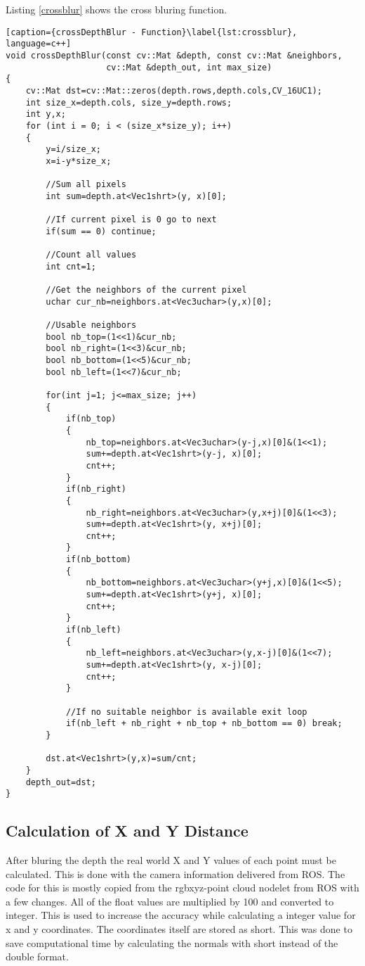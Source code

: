 
Listing \vref{crossblur} shows the cross bluring function.

\begin{lstlisting}[caption={crossDepthBlur - Function}\label{lst:crossblur}, language=c++]
void crossDepthBlur(const cv::Mat &depth, const cv::Mat &neighbors, 
                    cv::Mat &depth_out, int max_size)
{
	cv::Mat dst=cv::Mat::zeros(depth.rows,depth.cols,CV_16UC1);
	int size_x=depth.cols, size_y=depth.rows;
	int y,x;
	for (int i = 0; i < (size_x*size_y); i++)
	{
		y=i/size_x;
		x=i-y*size_x;

		//Sum all pixels
		int sum=depth.at<Vec1shrt>(y, x)[0];

		//If current pixel is 0 go to next
		if(sum == 0) continue;

		//Count all values
		int cnt=1;

		//Get the neighbors of the current pixel
		uchar cur_nb=neighbors.at<Vec3uchar>(y,x)[0];

		//Usable neighbors
		bool nb_top=(1<<1)&cur_nb;
		bool nb_right=(1<<3)&cur_nb;
		bool nb_bottom=(1<<5)&cur_nb;
		bool nb_left=(1<<7)&cur_nb;

		for(int j=1; j<=max_size; j++)
		{
			if(nb_top)
			{
				nb_top=neighbors.at<Vec3uchar>(y-j,x)[0]&(1<<1);
				sum+=depth.at<Vec1shrt>(y-j, x)[0];
				cnt++;
			}
			if(nb_right)
			{
				nb_right=neighbors.at<Vec3uchar>(y,x+j)[0]&(1<<3);
				sum+=depth.at<Vec1shrt>(y, x+j)[0];
				cnt++;
			}
			if(nb_bottom)
			{
				nb_bottom=neighbors.at<Vec3uchar>(y+j,x)[0]&(1<<5);
				sum+=depth.at<Vec1shrt>(y+j, x)[0];
				cnt++;
			}
			if(nb_left)
			{
				nb_left=neighbors.at<Vec3uchar>(y,x-j)[0]&(1<<7);
				sum+=depth.at<Vec1shrt>(y, x-j)[0];
				cnt++;
			}

			//If no suitable neighbor is available exit loop
			if(nb_left + nb_right + nb_top + nb_bottom == 0) break;
		}

		dst.at<Vec1shrt>(y,x)=sum/cnt;
	}
	depth_out=dst;
}
\end{lstlisting}

\subsection{Calculation of X and Y Distance}
After bluring the depth the real world X and Y values of each point must be calculated. 
This is done with the camera information delivered from ROS. 
The code for this is mostly copied from the rgbxyz-point cloud nodelet from ROS with a few changes.
All of the float values are multiplied by 100 and converted to integer. This is used to increase the accuracy while
calculating a integer value for x and y coordinates. The coordinates itself are stored as short. This was done to save
computational time by calculating the normals with short instead of the double format.

